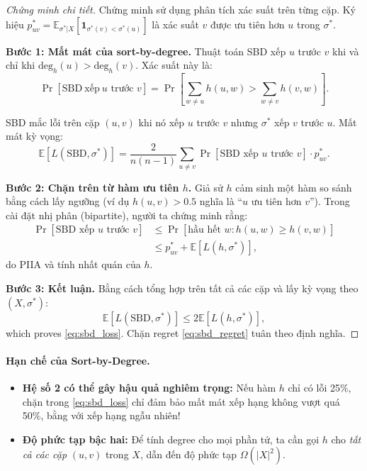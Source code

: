 \begin{proof}[Chứng minh chi tiết]
Chứng minh sử dụng phân tích xác suất trên từng cặp. Ký hiệu $p_{uv}^* = \mathbb{E}_{\sigma^*|X}[\mathbf{1}_{\sigma^*(v) < \sigma^*(u)}]$ là xác suất $v$ được ưu tiên hơn $u$ trong $\sigma^*$.

\textbf{Bước 1: Mất mát của sort-by-degree.}
Thuật toán SBD xếp $u$ trước $v$ khi và chỉ khi $\mathrm{deg}_h(u) > \mathrm{deg}_h(v)$. Xác suất này là:
\[
    \Pr[\mathrm{SBD \ xếp \ } u \text{ trước } v] = \Pr\left[\sum_{w \neq u} h(u,w) > \sum_{w \neq v} h(v,w)\right].
\]

SBD mắc lỗi trên cặp $(u,v)$ khi nó xếp $u$ trước $v$ nhưng $\sigma^*$ xếp $v$ trước $u$. Mất mát kỳ vọng:
\begin{equation}
    \mathbb{E}[L(\mathrm{SBD}, \sigma^*)] = \frac{2}{n(n-1)} \sum_{u \neq v} \Pr[\text{SBD xếp } u \text{ trước } v] \cdot p_{uv}^*.
\end{equation}

\textbf{Bước 2: Chặn trên từ hàm ưu tiên $h$.}
Giả sử $h$ cảm sinh một hàm so sánh bằng cách lấy ngưỡng (ví dụ $h(u,v) > 0.5$ nghĩa là ``$u$ ưu tiên hơn $v$''). Trong cài đặt nhị phân (bipartite), người ta chứng minh rằng:
\begin{align*}
    \Pr[\text{SBD xếp } u \text{ trước } v] &\leq \Pr[\text{hầu hết } w: h(u,w) \geq h(v,w)] \\
    &\leq p_{uv}^* + \mathbb{E}[L(h, \sigma^*)],
\end{align*}
do PIIA và tính nhất quán của $h$.

\textbf{Bước 3: Kết luận.}
Bằng cách tổng hợp trên tất cả các cặp và lấy kỳ vọng theo $(X, \sigma^*)$:
\[
    \mathbb{E}[L(\mathrm{SBD}, \sigma^*)] \leq 2 \mathbb{E}[L(h, \sigma^*)],
\]
which proves \eqref{eq:sbd_loss}. Chặn regret \eqref{eq:sbd_regret} tuân theo định nghĩa.
\end{proof}

\paragraph{Hạn chế của Sort-by-Degree.}
\begin{itemize}
    \item \textbf{Hệ số 2 có thể gây hậu quả nghiêm trọng:} Nếu hàm $h$ chỉ có lỗi 25\%, chặn trong \eqref{eq:sbd_loss} chỉ đảm bảo mất mát xếp hạng không vượt quá 50\%, bằng với xếp hạng ngẫu nhiên!
    \item \textbf{Độ phức tạp bậc hai:} Để tính degree cho mọi phần tử, ta cần gọi $h$ cho \emph{tất cả các cặp} $(u,v)$ trong $X$, dẫn đến độ phức tạp $\Omega(|X|^2)$.
\end{itemize}

